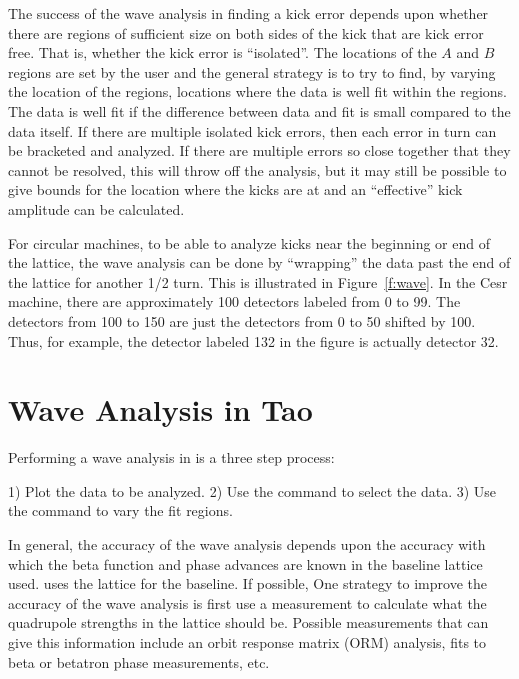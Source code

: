 The success of the wave analysis in finding a kick error depends upon
whether there are regions of sufficient size on both sides of the kick
that are kick error free. That is, whether the kick error is
``isolated''. The locations of the $A$ and $B$ regions are set by the
user and the general strategy is to try to find, by varying the
location of the regions, locations where the data is well fit within
the regions. The data is well fit if the difference between data and
fit is small compared to the data itself. If there are multiple
isolated kick errors, then each error in turn can be bracketed and
analyzed. If there are multiple errors so close together that they
cannot be resolved, this will throw off the analysis, but it may still
be possible to give bounds for the location where the kicks are at and
an ``effective'' kick amplitude can be calculated.

For circular machines, to be able to analyze kicks near the beginning
or end of the lattice, the wave analysis can be done by ``wrapping''
the data past the end of the lattice for another 1/2 turn. This is
illustrated in Figure~\ref{f:wave}. In the Cesr machine, there are
approximately 100 detectors labeled from 0 to 99.  The detectors from
100 to 150 are just the detectors from 0 to 50 shifted by 100. Thus,
for example, the detector labeled 132 in the figure is actually
detector 32.

\section{Wave Analysis in Tao}
\label{s:wave.tao}

Performing a wave analysis in \tao is a three step process:
\begin{example}
  1) Plot the data to be analyzed.
  2) Use the  command to select the data.
  3) Use the  command to vary the fit regions.
\end{example}

In general, the accuracy of the wave analysis depends upon the
accuracy with which the beta function and phase advances are known in
the baseline lattice used. \tao uses the  lattice for the
baseline. If possible, One strategy to improve the accuracy of the
wave analysis is first use a measurement to calculate what the
quadrupole strengths in the  lattice should be. Possible
measurements that can give this information include an orbit response
matrix (ORM) analysis, fits to beta or betatron phase measurements, etc.

